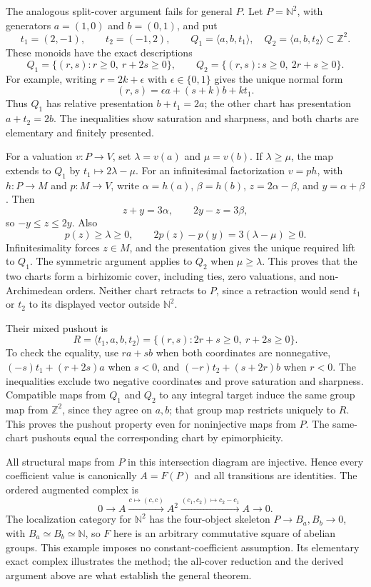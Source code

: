 \documentclass[11pt]{article}
\theoremstyle{definition}
\theoremstyle{remark}
\newcommand{\N}{\mathbb N}
\newcommand{\Z}{\mathbb Z}
\begin{document}
The analogous split-cover argument fails for general $P$. Let $P=\N^2$, with generators $a=(1,0)$ and $b=(0,1)$, and put
\[
 t_1=(2,-1),\qquad t_2=(-1,2),\qquad
 Q_1=\langle a,b,t_1\rangle,\quad Q_2=\langle a,b,t_2\rangle\subset\Z^2.
\]
These monoids have the exact descriptions
\[
 Q_1=\{(r,s):r\geq0,\ r+2s\geq0\},\qquad
 Q_2=\{(r,s):s\geq0,\ 2r+s\geq0\}.
\]
For example, writing $r=2k+\epsilon$ with $\epsilon\in\{0,1\}$ gives the unique normal form
\[
 (r,s)=\epsilon a+(s+k)b+kt_1.
\]
Thus $Q_1$ has relative presentation $b+t_1=2a$; the other chart has presentation $a+t_2=2b$. The inequalities show saturation and sharpness, and both charts are elementary and finitely presented.

For a valuation $v:P\to V$, set $\lambda=v(a)$ and $\mu=v(b)$. If $\lambda\geq\mu$, the map extends to $Q_1$ by $t_1\mapsto2\lambda-\mu$. For an infinitesimal factorization $v=ph$, with $h:P\to M$ and $p:M\to V$, write $\alpha=h(a)$, $\beta=h(b)$, $z=2\alpha-\beta$, and $y=\alpha+\beta$. Then
\[
 z+y=3\alpha,\qquad 2y-z=3\beta,
\]
so $-y\leq z\leq2y$. Also
\[
 p(z)\geq\lambda\geq0,\qquad
 2p(z)-p(y)=3(\lambda-\mu)\geq0.
\]
Infinitesimality forces $z\in M$, and the presentation gives the unique required lift to $Q_1$. The symmetric argument applies to $Q_2$ when $\mu\geq\lambda$. This proves that the two charts form a birhizomic cover, including ties, zero valuations, and non-Archimedean orders. Neither chart retracts to $P$, since a retraction would send $t_1$ or $t_2$ to its displayed vector outside $\N^2$.

Their mixed pushout is
\[
 R=\langle t_1,a,b,t_2\rangle
   =\{(r,s):2r+s\geq0,\ r+2s\geq0\}.
\]
To check the equality, use $ra+sb$ when both coordinates are nonnegative, $(-s)t_1+(r+2s)a$ when $s<0$, and $(-r)t_2+(s+2r)b$ when $r<0$. The inequalities exclude two negative coordinates and prove saturation and sharpness. Compatible maps from $Q_1$ and $Q_2$ to any integral target induce the same group map from $\Z^2$, since they agree on $a,b$; that group map restricts uniquely to $R$. This proves the pushout property even for noninjective maps from $P$. The same-chart pushouts equal the corresponding chart by epimorphicity.

All structural maps from $P$ in this intersection diagram are injective. Hence every coefficient value is canonically $A=F(P)$ and all transitions are identities. The ordered augmented complex is
\[
 0\longrightarrow A\xrightarrow{c\mapsto(c,c)}A^2
 \xrightarrow{(c_1,c_2)\mapsto c_2-c_1}A\longrightarrow0.
\]
The localization category for $\N^2$ has the four-object skeleton $P\to B_a,B_b\to0$, with $B_a\simeq B_b\simeq\N$, so $F$ here is an arbitrary commutative square of abelian groups. This example imposes no constant-coefficient assumption. Its elementary exact complex illustrates the method; the all-cover reduction and the derived argument above are what establish the general theorem.
\end{document}
